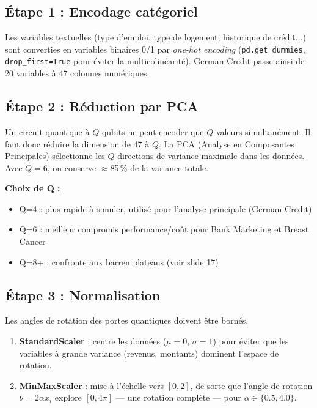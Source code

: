 \documentclass[12pt, a4paper]{article}
\begin{document}
\subsection*{Étape 1 : Encodage catégoriel}

Les variables textuelles (type d'emploi, type de logement, historique de crédit...)
sont converties en variables binaires 0/1 par \emph{one-hot encoding}
(\texttt{pd.get\_dummies}, \texttt{drop\_first=True} pour éviter la multicolinéarité).
German Credit passe ainsi de 20 variables à 47 colonnes numériques.

\subsection*{Étape 2 : Réduction par PCA}

Un circuit quantique à $Q$ qubits ne peut encoder que $Q$ valeurs simultanément.
Il faut donc réduire la dimension de 47 à $Q$.
La PCA (Analyse en Composantes Principales) sélectionne les $Q$ directions
de variance maximale dans les données.
Avec $Q=6$, on conserve $\approx$85\,\% de la variance totale.

\textbf{Choix de Q :}
\begin{itemize}
  \item Q=4 : plus rapide à simuler, utilisé pour l'analyse principale (German Credit)
  \item Q=6 : meilleur compromis performance/coût pour Bank Marketing et Breast Cancer
  \item Q=8+ : confronte aux barren plateaus (voir slide 17)
\end{itemize}

\subsection*{Étape 3 : Normalisation}

Les angles de rotation des portes quantiques doivent être bornés.
\begin{enumerate}
  \item \textbf{StandardScaler} : centre les données ($\mu=0$, $\sigma=1$)
        pour éviter que les variables à grande variance (revenus, montants)
        dominent l'espace de rotation.
  \item \textbf{MinMaxScaler} : mise à l'échelle vers $[0, 2]$,
        de sorte que l'angle de rotation $\theta = 2\alpha x_i$ explore $[0, 4\pi]$
        — une rotation complète — pour $\alpha \in \{0.5, 4.0\}$.
\end{enumerate}
\end{document}
